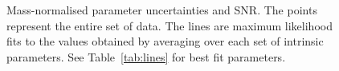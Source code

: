 \documentclass[useAMS,usedcolumn,usegraphicx,usenatbib]{mn2e}
\newcommand{\tabref}[1]{Table~\ref{tab:#1}}
\begin{document}
\begin{figure}
\begin{center}
    \quad
   \caption{Mass-normalised parameter uncertainties and SNR. The points represent the entire set of data. The lines are maximum likelihood fits to the values obtained by averaging over each set of intrinsic parameters. See \tabref{lines} for best fit parameters.}
   \label{fig:sigmas}
  \end{center}
\end{figure}
\end{document}
